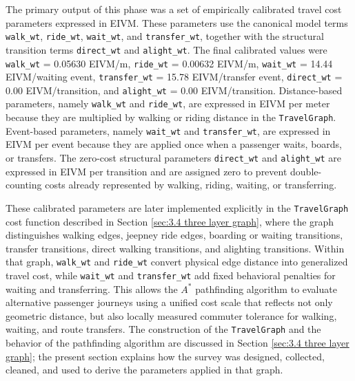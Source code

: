 The primary output of this phase was a set of empirically calibrated travel cost parameters expressed in \ac{EIVM}. These parameters use the canonical model terms \texttt{walk\_wt}, \texttt{ride\_wt}, \texttt{wait\_wt}, and \texttt{transfer\_wt}, together with the structural transition terms \texttt{direct\_wt} and \texttt{alight\_wt}. The final calibrated values were \texttt{walk\_wt} = 0.05630 \ac{EIVM}/m, \texttt{ride\_wt} = 0.00632 \ac{EIVM}/m, \texttt{wait\_wt} = 14.44 \ac{EIVM}/waiting event, \texttt{transfer\_wt} = 15.78 \ac{EIVM}/transfer event, \texttt{direct\_wt} = 0.00 \ac{EIVM}/transition, and \texttt{alight\_wt} = 0.00 \ac{EIVM}/transition. Distance-based parameters, namely \texttt{walk\_wt} and \texttt{ride\_wt}, are expressed in \ac{EIVM} per meter because they are multiplied by walking or riding distance in the \texttt{TravelGraph}. Event-based parameters, namely \texttt{wait\_wt} and \texttt{transfer\_wt}, are expressed in \ac{EIVM} per event because they are applied once when a passenger waits, boards, or transfers. The zero-cost structural parameters \texttt{direct\_wt} and \texttt{alight\_wt} are expressed in \ac{EIVM} per transition and are assigned zero to prevent double-counting costs already represented by walking, riding, waiting, or transferring.

These calibrated parameters are later implemented explicitly in the \texttt{TravelGraph} cost function described in Section \ref{sec:3.4 three layer graph}, where the graph distinguishes walking edges, jeepney ride edges, boarding or waiting transitions, transfer transitions, direct walking transitions, and alighting transitions. Within that graph, \texttt{walk\_wt} and \texttt{ride\_wt} convert physical edge distance into generalized travel cost, while \texttt{wait\_wt} and \texttt{transfer\_wt} add fixed behavioral penalties for waiting and transferring. This allows the \(A^{*}\) pathfinding algorithm to evaluate alternative passenger journeys using a unified cost scale that reflects not only geometric distance, but also locally measured commuter tolerance for walking, waiting, and route transfers. The construction of the \texttt{TravelGraph} and the behavior of the pathfinding algorithm are discussed in Section \ref{sec:3.4 three layer graph}; the present section explains how the survey was designed, collected, cleaned, and used to derive the parameters applied in that graph.


